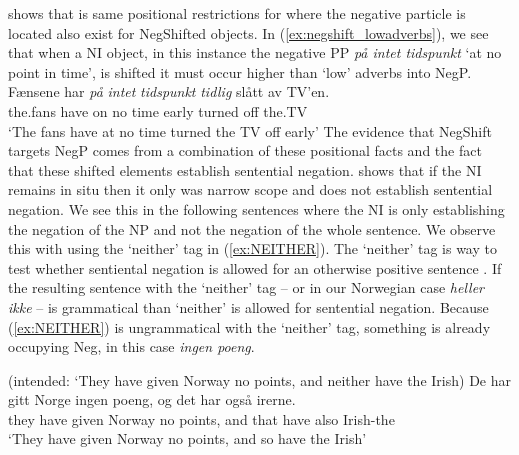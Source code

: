 \documentclass[12pt, letterpaper]{article}
\begin{document}
\citet{svenoniusStrainsNegationNorwegian2002} shows that is same positional restrictions for where the negative particle is located also exist for NegShifted objects. In (\ref{ex:negshift_lowadverbs}), we see that when a NI object, in this instance the negative PP \emph{på intet tidspunkt} `at no point in time', is shifted it must occur higher than `low' adverbs into NegP.  
\ea \label{ex:negshift_lowadverbs}
	\ea 
	\gll Fænsene har \emph{på} \emph{intet} \emph{tidspunkt} \emph{tidlig} slått av TV’en.\\
	the.fans have on no time early turned off the.TV\\
	\glt `The fans have at no time turned the TV off early’ 
	\z  
\z
The evidence that NegShift targets NegP comes from a combination of these positional facts and the fact that these shifted elements establish sentential negation. \citet{svenoniusStrainsNegationNorwegian2002} shows that if the NI remains in situ then it only was narrow scope and does not establish sentential negation. We see this in the following sentences where the NI is only establishing the negation of the NP and not the negation of the whole sentence. We observe this with using the `neither' tag in (\ref{ex:NEITHER}). The `neither' tag is way to test whether sentiental negation is allowed for an otherwise positive sentence \citep{klimaNegationEnglish1964}. If the resulting sentence with the `neither' tag – or in our Norwegian case \emph{heller ikke} – is grammatical than `neither' is allowed for sentential negation. Because (\ref{ex:NEITHER}) is ungrammatical with the `neither' tag, something is already occupying Neg, in this case \emph{ingen poeng}. 

\ea 
	\glt (intended: ‘They have given Norway no points, and neither have the Irish) \label{ex:NEITHER}
	\ex 
	\gll De har gitt Norge ingen poeng, og det har også irerne.\\
	they have given Norway no points, and that have also Irish-the\\
	\glt `They have given Norway no points, and so have the Irish'
	\z 
\z  
\end{document}
